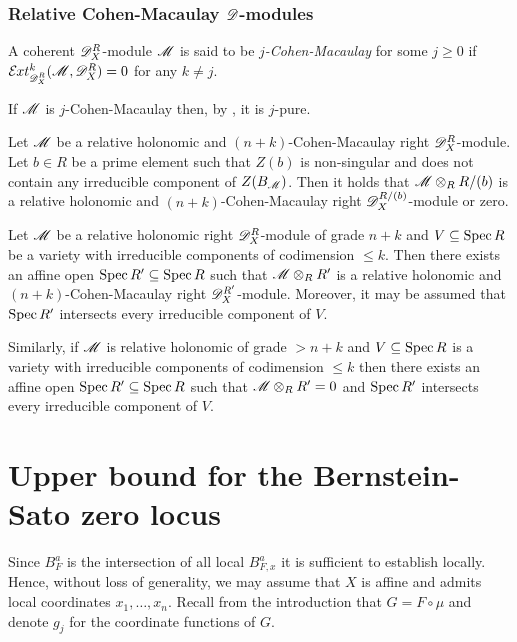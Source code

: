 \subsubsection{Relative Cohen-Macaulay $\mathscr{D}$-modules}
 \begin{definition}
   A coherent $\mathscr{D}_X^R$-module $\mathscr{M}$ is said to be {\it $j$-Cohen-Macaulay} for some $j\geq 0$ if $\Ex{\D_X^R}{k}(\M,\D_X^R) = 0$ for any $k\neq j$.
 \end{definition}
 \begin{remark}
  If $\mathscr{M}$ is $j$-Cohen-Macaulay then, by , it is $j$-pure.
 \end{remark}
 \begin{proposition}{\cite[Proof of Proposition 3.4.3]{budur2020zeroI}}\label{prop: CMRestriction}
   Let $\mathscr{M}$ be a relative holonomic and $(n+k)$-Cohen-Macaulay right $\mathscr{D}_X^R$-module. Let $b\in R$ be a prime element such that $Z(b)$ is non-singular and does not contain any irreducible component of $Z(B_{\mathscr{M}})$. Then it holds that $\mathscr{M}\otimes_R R/(b)$ is a relative holonomic and $(n+k)$-Cohen-Macaulay right $\mathscr{D}_X^{R/(b)}$-module or zero.
 \end{proposition}
 \begin{proposition}{\cite[Proof of Proposition 3.5.2]{budur2020zeroI}}\label{prop: RestrictToCM}
   Let $\mathscr{M}$ be a relative holonomic right $\mathscr{D}_X^R$-module of grade $n+k$ and $V\subseteq \operatorname{Spec} R$ be a variety with irreducible components of codimension $\leq k$.
   Then there exists an affine open $\operatorname{Spec} R' \subseteq \operatorname{Spec} R$ such that $\mathscr{M}\otimes_R R'$ is a relative holonomic and $(n+k)$-Cohen-Macaulay right $\mathscr{D}_X^{R'}$-module.
    Moreover, it may be assumed that $\operatorname{Spec} R'$ intersects every irreducible component of $V$.

    Similarly, if $\mathscr{M}$ is relative holonomic of grade $>n+k$ and $V\subseteq \operatorname{Spec} R$ is a variety with irreducible components of codimension $\leq k$ then there exists an affine open $\operatorname{Spec} R'\subseteq \operatorname{Spec} R$ such that $\mathscr{M}\otimes_R R' = 0$ and $\operatorname{Spec} R'$ intersects every irreducible component of $V$.
 \end{proposition}

 \section{Upper bound for the Bernstein-Sato zero locus}\label{sec: UpperBound}
 Since $B_F^a$ is the intersection of all local $B_{F,x}^a$ it is sufficient to establish  locally.
 Hence, without loss of generality, we may assume that $X$ is affine and admits local coordinates $x_1,\ldots, x_n$.
 Recall from the introduction that $G = F\circ\mu$ and denote $g_j$ for the coordinate functions of $G$.

